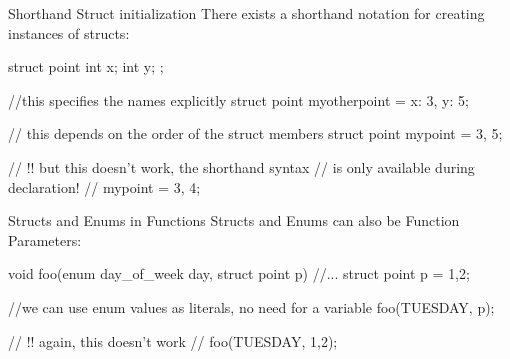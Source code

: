\documentclass[10pt,graphics,aspectratio=169,table]{beamer}
\begin{document}
\begin{frame}[fragile]{Shorthand Struct initialization}
    There exists a shorthand notation for creating instances of structs:
    \begin{codeblock}
struct point{
    int x;
    int y;
}; 

//this specifies the names explicitly
struct point myotherpoint = {x: 3, y: 5};

// this depends on the order of the struct members
struct point mypoint = {3, 5};

// !! but this doesn't work, the shorthand syntax
// is only available during declaration!
// mypoint = {3, 4};
    \end{codeblock}

\end{frame}

\begin{frame}[fragile]{Structs and Enums in Functions}
    Structs and Enums can also be Function Parameters:
    \begin{codeblock}
void foo(enum day_of_week day, struct point p){ 
    //...
}
struct point p = {1,2};

//we can use enum values as literals, no need for a variable
foo(TUESDAY, p);

// !! again, this doesn't work
// foo(TUESDAY, {1,2});

    \end{codeblock}
\end{frame}
\end{document}
